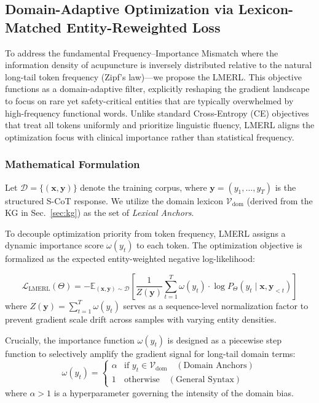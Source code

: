 \documentclass[preprint,5p,times,twocolumn,fleqn]{elsarticle}
\begin{document}
\subsection{Domain-Adaptive Optimization via Lexicon-Matched Entity-Reweighted Loss}
\label{sec:lmerl}

To address the fundamental Frequency--Importance Mismatch where the information density of acupuncture is inversely distributed relative to the natural long-tail token frequency (Zipf's law)—we propose the LMERL. This objective functions as a domain-adaptive filter, explicitly reshaping the gradient landscape to focus on rare yet safety-critical entities that are typically overwhelmed by high-frequency functional words. Unlike standard Cross-Entropy (CE) objectives that treat all tokens uniformly and prioritize linguistic fluency, LMERL aligns the optimization focus with clinical importance rather than statistical frequency.

\subsubsection{Mathematical Formulation}
Let $\mathcal{D} = \{(\mathbf{x}, \mathbf{y})\}$ denote the training corpus, where $\mathbf{y} = (y_1, \dots, y_T)$ is the structured S-CoT response. We utilize the domain lexicon $\mathcal{V}_{\text{dom}}$ (derived from the KG in Sec.~\ref{sec:kg}) as the set of \textit{Lexical Anchors}.

To decouple optimization priority from token frequency, LMERL assigns a dynamic importance score $\omega(y_t)$ to each token. The optimization objective is formalized as the expected entity-weighted negative log-likelihood:

\begin{equation}
\label{eq:lmerl}
\mathcal{L}_{\text{LMERL}}(\Theta) = - \mathbb{E}_{(\mathbf{x}, \mathbf{y}) \sim \mathcal{D}} \left[ \frac{1}{Z(\mathbf{y})} \sum_{t=1}^{T} \omega(y_t) \cdot \log P_{\Theta}(y_t \mid \mathbf{x}, \mathbf{y}_{<t}) \right]
\end{equation}
where $Z(\mathbf{y}) = \sum_{t=1}^{T} \omega(y_t)$ serves as a sequence-level normalization factor to prevent gradient scale drift across samples with varying entity densities.

Crucially, the importance function $\omega(y_t)$ is designed as a piecewise step function to selectively amplify the gradient signal for long-tail domain terms:
\begin{equation}
\label{eq:weight_func}
\omega(y_t) = 
\begin{cases} 
\alpha & \text{if } y_t \in \mathcal{V}_{\text{dom}} \quad (\text{Domain Anchors}) \\
1 & \text{otherwise} \quad (\text{General Syntax})
\end{cases}
\end{equation}
where $\alpha > 1$ is a hyperparameter governing the intensity of the domain bias.
\end{document}

